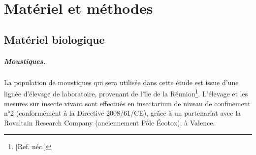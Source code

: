\chapter{Matériel et méthodes}

\section{Matériel biologique}

\paragraph{Moustiques.}
\label{par:moustiques}
La population de moustiques  qui sera utilisée dans cette étude est issue d'une lignée d'élevage de laboratoire, provenant de l'île de la Réunion\footnote{[Ref. néc.]}.
L'élevage et les mesures sur insecte vivant sont effectués en insectarium de niveau de confinement n°2 (conformément à la Directive 2008/61/CE), grâce à un partenariat avec la Rovaltain Research Company (anciennement Pôle Écotox), à Valence.